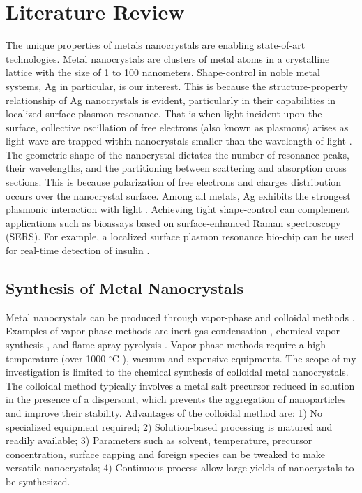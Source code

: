 \section{Literature Review}

The unique properties of metals nanocrystals are enabling state-of-art technologies.
Metal nanocrystals are clusters of metal atoms in a crystalline lattice with the size of 1 to 100 nanometers.
Shape-control in noble metal systems, Ag in particular, is our interest.
This is because the structure-property relationship of Ag nanocrystals is evident, particularly in their capabilities in localized surface plasmon resonance.
That is when light incident upon the surface, collective oscillation of free electrons (also known as plasmons) arises as light wave are trapped within nanocrystals smaller than the wavelength of light \cite{Petryayeva_2011}.
The geometric shape of the nanocrystal dictates the number of resonance peaks, their wavelengths, and the partitioning between scattering and absorption cross sections.
This is because polarization of free electrons and charges distribution occurs over the nanocrystal surface.
Among all metals, Ag exhibits the strongest plasmonic interaction with light \cite{Lu_2009}.
Achieving tight shape-control can complement applications such as bioassays based on surface-enhanced Raman spectroscopy (SERS).
For example, a localized surface plasmon resonance bio-chip can be used for real-time detection of insulin \cite{Hiep_2008}.

\subsection{Synthesis of Metal Nanocrystals}

Metal nanocrystals can be produced through vapor-phase \cite{Swihart_2003} and colloidal methods \cite{Tao_2008}. Examples of vapor-phase methods are inert gas condensation \cite{Wegner_2002,Simchi_2007}, chemical vapor synthesis \cite{Lee_2012,Ostraat_2001}, and flame spray pyrolysis \cite{Teoh_2010}. 
Vapor-phase methods require a high temperature (over 1000 $^{\circ}$C \cite{Smetana_2005}), vacuum and expensive equipments.
The scope of my investigation is limited to the chemical synthesis of colloidal metal nanocrystals.
The colloidal method typically involves a metal salt precursor reduced in solution in the presence of a dispersant, which prevents the aggregation of nanoparticles and improve their stability.
Advantages of the colloidal method are: 
1) No specialized equipment required; 
2) Solution-based processing is matured and readily available;
3) Parameters such as solvent, temperature, precursor concentration, surface capping and foreign species can be tweaked to make versatile nanocrystals;
4) Continuous process allow large yields of nanocrystals to be synthesized.

